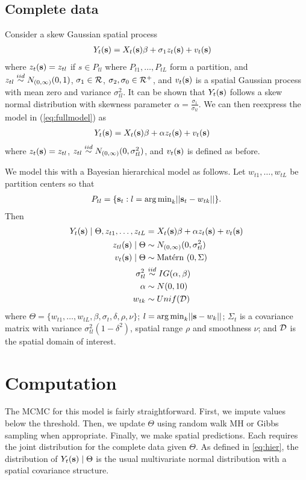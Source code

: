 \documentclass[11pt]{article}
\begin{document}
\subsection{Complete data}\label{s:model}
Consider a skew Gaussian spatial process
\begin{align} \label{eq:fullmodel}
  Y_t(\mbox{\bf s}) &= X_t(\mbox{\bf s}) \beta + \sigma_1 z_t(\mbox{\bf s}) + v_t(\mbox{\bf s})
\end{align}
where $z_t(\mbox{\bf s}) = z_{tl}$ if $s \in P_{tl}$ where $P_{t1}, \ldots, P_{tL}$ form a partition, and $z_{tl} \stackrel{iid}{\sim} N_{(0, \infty)}(0, 1)$, $\sigma_1 \in {\cal R}$, $\sigma_2, \sigma_0 \in {\cal R}^+$, and $v_t(\mbox{\bf s})$ is a spatial Gaussian process with mean zero and variance $\sigma_{tl}^2$.
It can be shown \citep{Zhang2010} that $Y_t(\mbox{\bf s})$ follows a skew normal distribution with skewness parameter $\alpha = \frac{ \sigma_1 }{ \sigma_{tl} }$.
We can then reexpress the model in (\ref{eq:fullmodel}) as
\begin{align}
  Y_t(\mbox{\bf s}) &= X_t(\mbox{\bf s}) \beta + \alpha z_t(\mbox{\bf s}) + v_t(\mbox{\bf s})
\end{align}
where $z_t(\mbox{\bf s}) = z_{tl}$, $z_{tl} \stackrel{iid}{\sim} N_{(0, \infty)}(0, \sigma_{tl}^2)$, and $v_t(\mbox{\bf s})$ is defined as before.

We model this with a Bayesian hierarchical model as follows.
Let $w_{t1}, \ldots, w_{tL}$ be partition centers so that
\begin{align*}
  P_{tl} = \{\mbox{\bf s}_t : l = {\mathop{\rm arg\, min}}_k || \mbox{\bf s}_t - w_{tk} ||\}.
\end{align*}
Then
\begin{align}
    Y_t(\mbox{\bf s}) \mid \Theta, z_{t1}, \ldots, z_{tL} &= X_t(\mbox{\bf s}) \beta + \alpha z_t(\mbox{\bf s}) + v_t(\mbox{\bf s}) \label{eq:hier}\\
    z_{tl}(\mbox{\bf s}) \mid \Theta &\sim N_{(0, \infty)}(0, \sigma^2_{tl})\\
    v_t(\mbox{\bf s}) \mid \Theta &\sim \mbox{Mat$\acute{\mbox{e}}$rn }(0, \Sigma)\\
    \sigma^2_{tl} &\stackrel{iid}{\sim} IG(\alpha, \beta)\\
    \alpha &\sim N(0, 10)\\
    w_{tk} &\sim Unif({\cal D})
\end{align}
where $\Theta = \{w_{t1}, \ldots, w_{tL}, \beta, \sigma_t, \delta, \rho, \nu \}$; $l = {\mathop{\rm arg\, min}}_k ||\mbox{\bf s} - w_k ||$; $\Sigma_t$ is a \Matern covariance matrix with variance $\sigma_{tl}^2 (1 - \delta^2)$, spatial range $\rho$ and smoothness $\nu$; and ${\cal D}$ is the spatial domain of interest.

\section{Computation}\label{s:comp}
The MCMC for this model is fairly straightforward.
First, we impute values below the threshold.
Then, we update $\Theta$ using random walk MH or Gibbs sampling when appropriate.
Finally, we make spatial predictions.
Each requires the joint distribution for the complete data given $\Theta$.
As defined in \ref{eq:hier}, the distribution of $Y_t(\mbox{\bf s}) \mid \Theta$ is the usual multivariate normal distribution with a \Matern spatial covariance structure.
\end{document}
